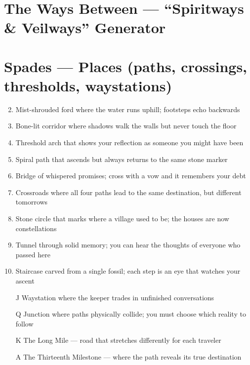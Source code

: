\section{The Ways Between --- ``Spiritways \& Veilways'' Generator}
\label{chap:ways-between}

\section*{Spades --- Places (paths, crossings, thresholds, waystations)}
\label{sec:ways-between-places}
\begin{enumerate}
\setcounter{enumi}{1}
\item Mist-shrouded ford where the water runs uphill; footsteps echo backwards
\item Bone-lit corridor where shadows walk the walls but never touch the floor
\item Threshold arch that shows your reflection as someone you might have been
\item Spiral path that ascends but always returns to the same stone marker
\item Bridge of whispered promises; cross with a vow and it remembers your debt
\item Crossroads where all four paths lead to the same destination, but different tomorrows
\item Stone circle that marks where a village used to be; the houses are now constellations
\item Tunnel through solid memory; you can hear the thoughts of everyone who passed here
\item Staircase carved from a single fossil; each step is an eye that watches your ascent
\item[J] Waystation where the keeper trades in unfinished conversations
\item[Q] Junction where paths physically collide; you must choose which reality to follow
\item[K] The Long Mile --- road that stretches differently for each traveler
\item[A] The Thirteenth Milestone --- where the path reveals its true destination
\end{enumerate}

